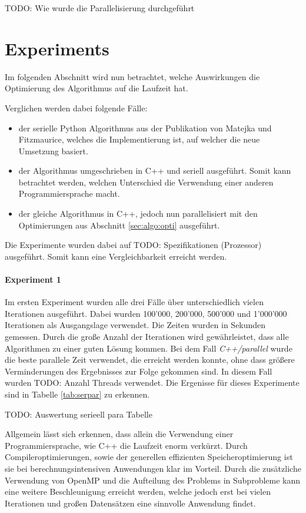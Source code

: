 \documentclass[sigconf]{acmart}
\begin{document}
TODO: Wie wurde die Parallelisierung durchgeführt


\section{Experiments}\label{sec:exp}

Im folgenden Abschnitt wird nun betrachtet, welche Auswirkungen die Optimierung des Algorithmus auf die Laufzeit hat. 

Verglichen werden dabei folgende Fälle:

\begin{itemize}
  \item der serielle Python Algorithmus aus der Publikation von Matejka und Fitzmaurice, welches die Implementierung ist, auf welcher die neue Umsetzung basiert. 
  \item der Algorithmus umgeschrieben in C++ und seriell ausgeführt. Somit kann betrachtet werden, welchen Unterschied die Verwendung einer anderen Programmiersprache macht.
  \item der gleiche Algorithmus in C++, jedoch nun parallelisiert mit den Optimierungen aus Abschnitt \ref{sec:algo:opti} ausgeführt.
\end{itemize}

Die Experimente wurden dabei auf 
TODO: Spezifikationen (Prozessor)
ausgeführt. Somit kann eine Vergleichbarkeit erreicht werden.

\paragraph{Experiment 1}

Im ersten Experiment wurden alle drei Fälle über unterschiedlich vielen Iterationen ausgeführt. Dabei wurden 100'000, 200'000, 500'000 und 1'000'000 Iterationen als Ausgangslage verwendet. Die Zeiten wurden in Sekunden gemessen. Durch die große Anzahl der Iterationen wird gewährleistet, dass alle Algorithmen zu einer guten Lösung kommen. 
Bei dem Fall \textit{C++/parallel} wurde die beste parallele Zeit verwendet, die erreicht werden konnte, ohne dass größere Verminderungen des Ergebnisses zur Folge gekommen sind. In diesem Fall wurden TODO: Anzahl Threads verwendet.
 Die Ergenisse für dieses Experimente sind in Tabelle \ref{tab:serpar} zu erkennen. 

 TODO: Auswertung serieell para Tabelle

 Allgemein lässt sich erkennen, dass allein die Verwendung einer Programmiersprache, wie C++ die Laufzeit enorm verkürzt. Durch Compileroptimierungen, sowie der generellen effizienten Speicheroptimierung ist sie bei berechnungsintensiven Anwendungen klar im Vorteil. Durch die zusätzliche Verwendung von OpenMP und die Aufteilung des Problems in Subprobleme kann eine weitere Beschleunigung erreicht werden, welche jedoch erst bei vielen Iterationen und großen Datensätzen eine sinnvolle Anwendung findet.
\end{document}
